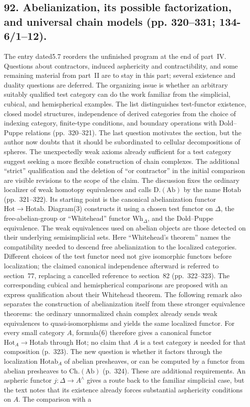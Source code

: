 \documentclass[10pt,oneside]{book}
\begin{document}
\subsection*{92. Abelianization, its possible factorization, and universal chain models (pp. 320--331; 134-6/1--12).}
The entry dated5.7 reorders the unfinished program at the end of part~IV. Questions about contractors, induced asphericity and contractibility, and some remaining material from part~II are to stay in this part; several existence and duality questions are deferred. The organizing issue is whether an arbitrary suitably qualified test category can do the work familiar from the simplicial, cubical, and hemispherical examples. The list distinguishes test-functor existence, closed model structures, independence of derived categories from the choice of indexing category, finite-type conditions, and boundary operations with Dold--Puppe relations (pp.~320--321). The last question motivates the section, but the author now doubts that it should be subordinated to cellular decompositions of spheres. The unexpectedly weak axioms already sufficient for a test category suggest seeking a more flexible construction of chain complexes. The additional ``strict'' qualification and the deletion of ``or contractor'' in the initial comparison are visible revisions to the scope of the claim. The discussion fixes the ordinary localizer of weak homotopy equivalences and calls $\mathrm{D.}(\mathrm{Ab})$ by the name $\mathrm{Hotab}$ (pp.~321--322). Its starting point is the canonical abelianization functor $\mathrm{Hot}\to\mathrm{Hotab}$. Diagram(3) constructs it using a chosen test functor on $\Delta$, the free-abelian-group or ``Whitehead'' functor $\mathrm{Wh}_{\Delta}$, and the Dold--Puppe equivalence. The weak equivalences used on abelian objects are those detected on their underlying semisimplicial sets. Here ``Whitehead's theorem'' names the compatibility needed to descend free abelianization to the localized categories. Different choices of the test functor need not give isomorphic functors before localization; the claimed canonical independence afterward is referred to section~77, replacing a cancelled reference to section~82 (pp.~322--323). The corresponding cubical and hemispherical comparisons are proposed with an express qualification about their Whitehead theorem. The following remark also separates the construction of abelianization itself from these stronger equivalence theorems: the ordinary unnormalized chain complex already sends weak equivalences to quasi-isomorphisms and yields the same localized functor. For every small category $A$, formula(6) therefore gives a canonical functor $\mathrm{Hot}_A\to\mathrm{Hotab}$ through $\mathrm{Hot}$; no claim that $A$ is a test category is needed for that composition (p.~323). The new question is whether it factors through the localization $\mathrm{Hotab}_A$ of abelian presheaves, or can be computed by a functor from abelian presheaves to $\mathrm{Ch.}(\mathrm{Ab})$ (p.~324). These are additional requirements. An aspheric functor $j:\Delta\to A^{\wedge}$ gives a route back to the familiar simplicial case, but the text notes that its existence already forces substantial asphericity conditions on $A$. The comparison with a 
\end{document}
